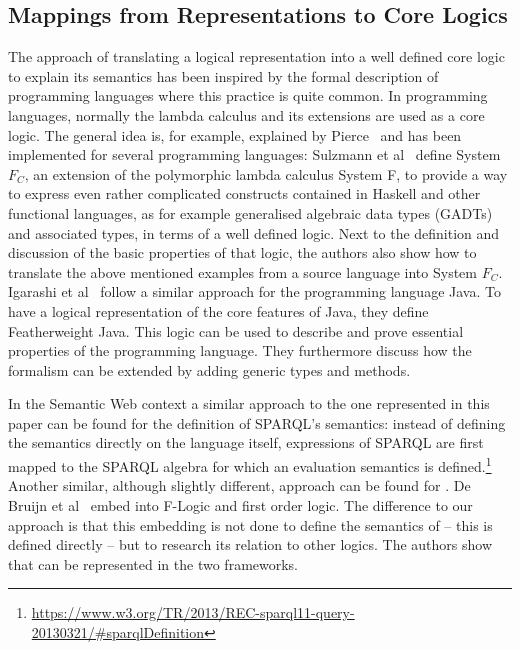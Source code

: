 
\subsection{Mappings from Representations to Core Logics}
The approach of translating a logical representation into a well defined core logic to explain its semantics has been inspired by the formal description of 
programming languages where this practice is quite 
common. In programming languages, normally the lambda calculus and its extensions are used as a core logic. The general idea is, for example, explained by Pierce~\cite{Pierce}
and has been implemented for several programming languages: Sulzmann et al~\cite{Sulzmann} define System $F_C$, an extension of the polymorphic lambda calculus System F, to provide 
a way to express even rather complicated constructs contained in Haskell and other functional languages, as for example generalised algebraic data types (GADTs) and associated types,
in terms of a well defined logic.
Next to the definition and discussion of the basic properties of that logic, the authors also show how to translate the above mentioned examples from a
source language  into System $F_C$.
Igarashi et al~\cite{Igarashi} follow a similar approach for the programming language Java. To have a logical representation of the core features of Java, they define 
Featherweight Java. This logic can be used to describe and prove essential properties of the programming language. They furthermore discuss how the formalism can be extended 
by adding generic types and methods.

In the Semantic Web context a similar approach to the one represented in this paper can be found for the definition of SPARQL's semantics: 
instead of defining the semantics directly 
on the language itself, expressions of SPARQL are first mapped to the SPARQL algebra %
for which an evaluation 
semantics is defined.\footnote{\url{https://www.w3.org/TR/2013/REC-sparql11-query-20130321/\#sparqlDefinition}}
Another similar, although slightly different, approach can be found for \rdf. De Bruijn et al~\cite{erdf} embed \rdf into F-Logic and first order logic. The difference to our
approach is that this embedding is not done to define the semantics of \rdf{} -- this is defined directly -- but to research its relation to other logics.
The authors show that \rdf can be represented in the two frameworks.
